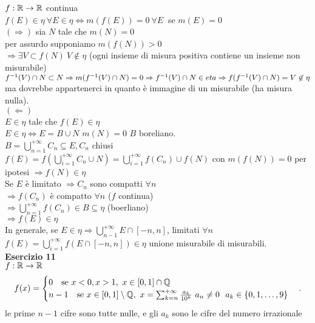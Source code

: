 \documentclass[12px]{article}
\begin{document}
$f:\mathbb{R} \rightarrow\mathbb{R}$ continua\\
$f(E)\in\eta \ \forall E\in\eta \Leftrightarrow m(f(E)) = 0 \ \forall E\ $ se $m(E) = 0$\\
 $ ( \Rightarrow )$ sia $N$ tale  che $m(N) = 0$\\
 per assurdo supponiamo $m(f(N)) > 0$ \\
  $ \Rightarrow \exists V\subset f(N) \ V\not\in \eta$ (ogni insieme di misura positiva contiene un insieme non misurabile)\\
  $f^{-1}(V)\cap N\subset N \Rightarrow  m(f^{-1}(V)\cap N) = 0 \\\Rightarrow  f^{-1}(V)\cap N\in eta \Rightarrow f(f^{-1}(V)\cap N) = V\not\in \eta$ ma dovrebbe appartenerci in quanto è immagine di un misurabile (ha misura nulla).\\
  $ ( \Leftarrow)$\\
   $E\in \eta$ tale che  $f(E)\in \eta$\\
    $E\in \eta \Leftrightarrow E = B\cup N$ $m(N) = 0$ $B$ boreliano.\\
    $B = \bigcup^{+\infty}_{n=1}C_n\subseteq E, C_n$ chiusi\\
    $f(E) = f( \bigcup^{+\infty}_{i = 1}C_n\cup N) = \bigcup^{+\infty}_{i=1}f(C_n)\cup f(N)$ con $m(f(N)) = 0$ per ipotesi  $ \Rightarrow  f(N)\in \eta$ \\
    Se $E $ è limitato $ \Rightarrow C_n$ sono compatti $\forall n$\\
     $ \Rightarrow f(C_n)$ è compatto $\forall n $ ($f$ continua)\\ 
     $ \Rightarrow  \bigcup^{+\infty}_{n=1}f(C_n)\in B\subseteq \eta$ (boerliano)\\
     $ \Rightarrow f(E)\in \eta$ \\
     In generale, se $E\in\eta \Rightarrow \bigcup^{+\infty}_{n-1}E\cap[-n,n]$, limitati $\forall n$  $f(E) = \bigcup^{+\infty}_{i = 1}f(E\cap[-n,n])\in\eta$ unione misurabile di misurabili.\\
     \textbf{Esercizio 11}\\
     $f: \mathbb{R} \rightarrow \mathbb{R}$\\
     \[
     f(x) = \begin{cases}
	     0 \ \ \text{ se } x < 0 , x > 1, \ x \in[0,1]\cap \Q\\
	     n - 1\ \ \text{ se } x\in[0,1]\setminus\Q, \ x = \sum^{+\infty}_{k = n}\frac{a_k}{10^k} \ a_n \neq 0\ \ a_k\in\{0,1,\ldots,9\}
     \end{cases}
     .\] 
     le prime $n-1$ cifre sono tutte nulle, e gli $a_k$ sono le cifre del numero irrazionale\\
\end{document}
